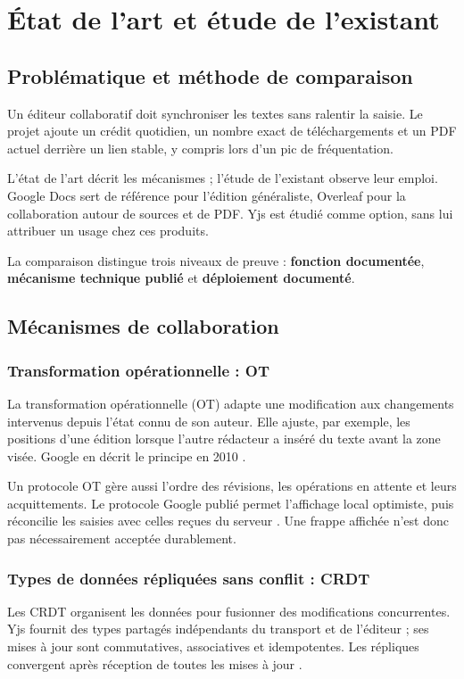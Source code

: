 \chapter{État de l'art et étude de l'existant}
\section{Problématique et méthode de comparaison}
Un éditeur collaboratif doit synchroniser les textes sans ralentir la saisie. Le projet ajoute un crédit quotidien, un nombre exact de téléchargements et un PDF actuel derrière un lien stable, y compris lors d'un pic de fréquentation.

L'état de l'art décrit les mécanismes ; l'étude de l'existant observe leur emploi. Google Docs sert de référence pour l'édition généraliste, Overleaf pour la collaboration autour de sources et de PDF. Yjs est étudié comme option, sans lui attribuer un usage chez ces produits.

La comparaison distingue trois niveaux de preuve : \textbf{fonction documentée}, \textbf{mécanisme technique publié} et \textbf{déploiement documenté}. 

\section{Mécanismes de collaboration}
\subsection{Transformation opérationnelle : OT}
La transformation opérationnelle (OT) adapte une modification aux changements intervenus depuis l'état connu de son auteur. Elle ajuste, par exemple, les positions d'une édition lorsque l'autre rédacteur a inséré du texte avant la zone visée. Google en décrit le principe en 2010 \cite{google-ot}.

Un protocole OT gère aussi l'ordre des révisions, les opérations en attente et leurs acquittements. Le protocole Google publié permet l'affichage local optimiste, puis réconcilie les saisies avec celles reçues du serveur \cite{google-protocole}. Une frappe affichée n'est donc pas nécessairement acceptée durablement.

\subsection{Types de données répliquées sans conflit : CRDT}
Les CRDT organisent les données pour fusionner des modifications concurrentes. Yjs fournit des types partagés indépendants du transport et de l'éditeur ; ses mises à jour sont commutatives, associatives et idempotentes. Les répliques convergent après réception de toutes les mises à jour \cite{yjs-intro,yjs-updates}.

